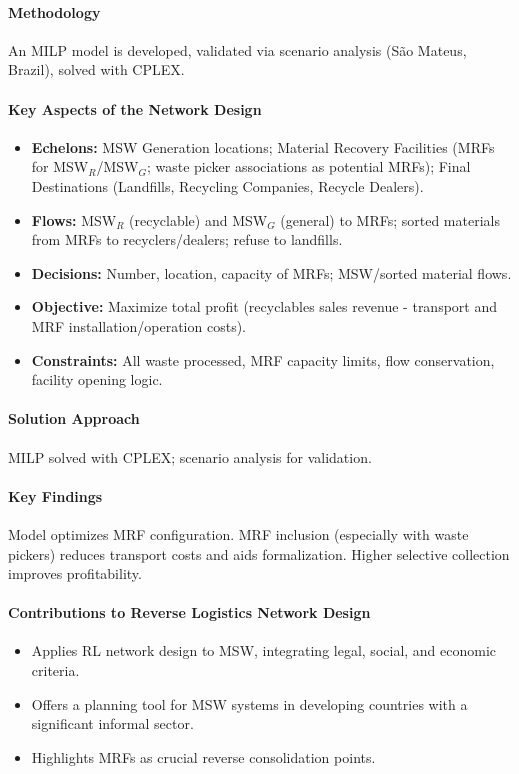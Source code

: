 \paragraph{Methodology} An MILP model is developed, validated via scenario analysis (São Mateus, Brazil), solved with CPLEX.
\paragraph{Key Aspects of the Network Design}
\begin{itemize}
    \item \textbf{Echelons:} MSW Generation locations; Material Recovery Facilities (MRFs for MSW$_{R}$/MSW$_{G}$; waste picker associations as potential MRFs); Final Destinations (Landfills, Recycling Companies, Recycle Dealers).
    \item \textbf{Flows:} MSW$_{R}$ (recyclable) and MSW$_{G}$ (general) to MRFs; sorted materials from MRFs to recyclers/dealers; refuse to landfills.
    \item \textbf{Decisions:} Number, location, capacity of MRFs; MSW/sorted material flows.
    \item \textbf{Objective:} Maximize total profit (recyclables sales revenue - transport and MRF installation/operation costs).
    \item \textbf{Constraints:} All waste processed, MRF capacity limits, flow conservation, facility opening logic.
\end{itemize}
\paragraph{Solution Approach} MILP solved with CPLEX; scenario analysis for validation.
\paragraph{Key Findings} Model optimizes MRF configuration. MRF inclusion (especially with waste pickers) reduces transport costs and aids formalization. Higher selective collection improves profitability.
\paragraph{Contributions to Reverse Logistics Network Design}
\begin{itemize}
    \item Applies RL network design to MSW, integrating legal, social, and economic criteria.
    \item Offers a planning tool for MSW systems in developing countries with a significant informal sector.
    \item Highlights MRFs as crucial reverse consolidation points.
\end{itemize}
